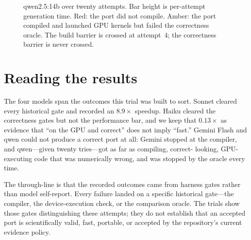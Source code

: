 \documentclass[11pt]{article}
\begin{document}
\begin{figure}[htbp]
\centering
{}
\caption{qwen2.5:14b over twenty attempts. Bar height is per-attempt generation
time. Red: the port did not compile. Amber: the port compiled and launched GPU
kernels but failed the correctness oracle. The build barrier is crossed at
attempt~4; the correctness barrier is never crossed.}
\label{fig:qwen}
\end{figure}

\section{Reading the results}

The four models span the outcomes this trial was built to sort. Sonnet cleared
every historical gate and recorded an $8.9\times$ speedup. Haiku
cleared the correctness gates but not the performance bar, and we keep that
$0.13\times$ as evidence that ``on the GPU and correct'' does not imply ``fast.''
Gemini Flash and qwen could not produce a correct port at all: Gemini stopped at
the compiler, and qwen---given twenty tries---got as far as compiling, correct-
looking, GPU-executing code that was numerically wrong, and was stopped by the
oracle every time.

The through-line is that the recorded outcomes came from harness gates rather
than model self-report. Every failure landed on a specific historical
gate---the compiler, the device-execution check, or the comparison oracle. The
trials show those gates distinguishing these attempts; they do not establish
that an accepted port is scientifically valid, fast, portable, or accepted by
the repository's current evidence policy.
\end{document}
